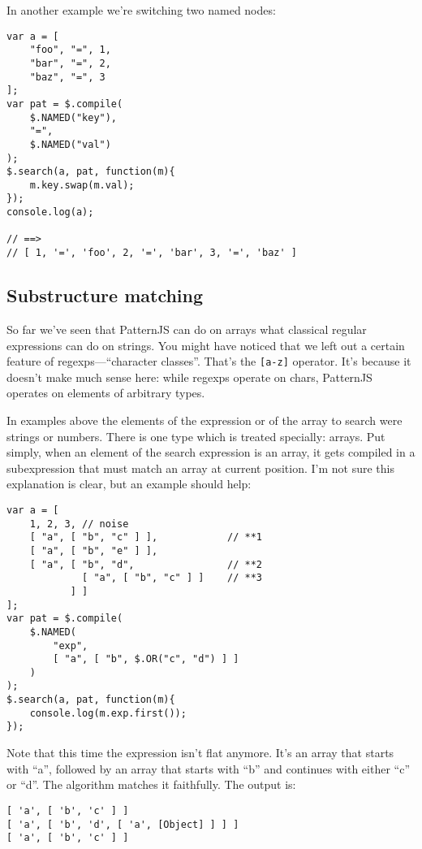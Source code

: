 \documentclass[a4paper,10pt]{article}
\begin{document}
In another example we're switching two named nodes:


\begin{verbatim}
var a = [
    "foo", "=", 1,
    "bar", "=", 2,
    "baz", "=", 3
];
var pat = $.compile(
    $.NAMED("key"),
    "=",
    $.NAMED("val")
);
$.search(a, pat, function(m){
    m.key.swap(m.val);
});
console.log(a);

// ==>
// [ 1, '=', 'foo', 2, '=', 'bar', 3, '=', 'baz' ]
\end{verbatim}
\subsection{Substructure matching}
\label{sec-2-10}


So far we've seen that PatternJS can do on arrays what classical regular
expressions can do on strings.  You might have noticed that we left out a
certain feature of regexps—“character classes”.  That's the \texttt{[a-z]}
operator.  It's because it doesn't make much sense here: while regexps
operate on chars, PatternJS operates on elements of arbitrary types.

In examples above the elements of the expression or of the array to search
were strings or numbers.  There is one type which is treated specially:
arrays.  Put simply, when an element of the search expression is an array,
it gets compiled in a subexpression that must match an array at current
position.  I'm not sure this explanation is clear, but an example should
help:


\begin{verbatim}
var a = [
    1, 2, 3, // noise
    [ "a", [ "b", "c" ] ],            // **1
    [ "a", [ "b", "e" ] ],
    [ "a", [ "b", "d",                // **2
             [ "a", [ "b", "c" ] ]    // **3
           ] ]
];
var pat = $.compile(
    $.NAMED(
        "exp",
        [ "a", [ "b", $.OR("c", "d") ] ]
    )
);
$.search(a, pat, function(m){
    console.log(m.exp.first());
});
\end{verbatim}

Note that this time the expression isn't flat anymore.  It's an array that
starts with “a”, followed by an array that starts with “b” and continues
with either “c” or “d”.  The algorithm matches it faithfully.  The output
is:


\begin{verbatim}
[ 'a', [ 'b', 'c' ] ]
[ 'a', [ 'b', 'd', [ 'a', [Object] ] ] ]
[ 'a', [ 'b', 'c' ] ]
\end{verbatim}
\end{document}
